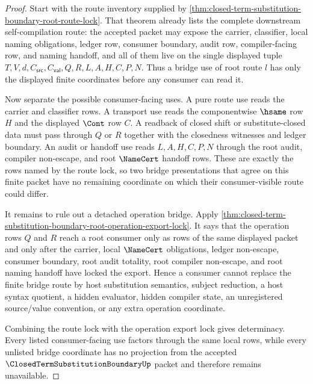\begin{proof}
Start with the route inventory supplied by \autoref{thm:closed-term-substitution-boundary-root-route-lock}. That theorem already lists the complete downstream self-compilation route: the accepted packet may expose the carrier, classifier, local naming obligations, ledger row, consumer boundary, audit row, compiler-facing row, and naming handoff, and all of them live on the single displayed tuple $T,V,d,C_{\mathsf{src}},C_{\mathsf{val}},Q,R,L,A,H,C,P,N$. Thus a bridge use of root route $l$ has only the displayed finite coordinates before any consumer can read it.

Now separate the possible consumer-facing uses. A pure route use reads the carrier and classifier rows. A transport use reads the componentwise $\hsame$ row $H$ and the displayed $\Cont$ row $C$. A readback of closed shift or substitute-closed data must pass through $Q$ or $R$ together with the closedness witnesses and ledger boundary. An audit or handoff use reads $L,A,H,C,P,N$ through the root audit, compiler non-escape, and root $\NameCert$ handoff rows. These are exactly the rows named by the route lock, so two bridge presentations that agree on this finite packet have no remaining coordinate on which their consumer-visible route could differ.

It remains to rule out a detached operation bridge. Apply \autoref{thm:closed-term-substitution-boundary-root-operation-export-lock}. It says that the operation rows $Q$ and $R$ reach a root consumer only as rows of the same displayed packet and only after the carrier, local $\NameCert$ obligations, ledger non-escape, consumer boundary, root audit totality, root compiler non-escape, and root naming handoff have locked the export. Hence a consumer cannot replace the finite bridge route by host substitution semantics, subject reduction, a host syntax quotient, a hidden evaluator, hidden compiler state, an unregistered source/value convention, or any extra operation coordinate.

Combining the route lock with the operation export lock gives determinacy. Every listed consumer-facing use factors through the same local rows, while every unlisted bridge coordinate has no projection from the accepted $\ClosedTermSubstitutionBoundaryUp$ packet and therefore remains unavailable.
\end{proof}

